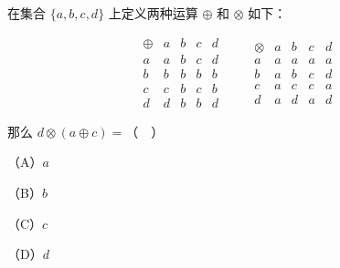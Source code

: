 \begin{question}
在集合 $\{a,b,c,d\}$ 上定义两种运算 $\oplus$ 和 $\otimes$ 如下：

\nopagebreak[4]
\[
\begin{array}{c|cccc}
\oplus & a & b & c & d\\\hline
a & a & b & c & d\\
b & b & b & b & b\\
c & c & b & c & b\\
d & d & b & b & d
\end{array}
\qquad
\begin{array}{c|cccc}
\otimes & a & b & c & d\\\hline
a & a & a & a & a\\
b & a & b & c & d\\
c & a & c & c & a\\
d & a & d & a & d
\end{array}
\]

那么 $d\otimes(a\oplus c)=$（　）

（A）$a$

（B）$b$

（C）$c$

（D）$d$

\end{question}

